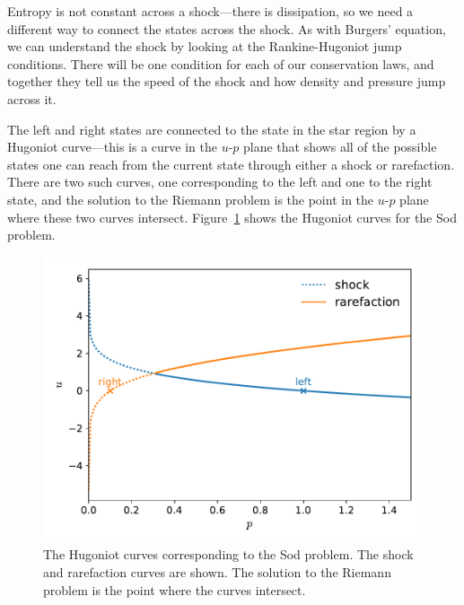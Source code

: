 Entropy is not constant across a shock---there is dissipation, so we
need a different way to connect the states across the shock.  As with
Burgers' equation, we can understand the shock by looking at the
Rankine-Hugoniot jump conditions.  There will be one condition for
each of our conservation laws, and together they tell us the speed of
the shock and how density and pressure jump across
it.  

The left and right states are connected to the state in the star
region by a Hugoniot curve---this is a curve in the $u$-$p$ plane that
shows all of the possible states one can reach from the current state
through either a shock or rarefaction.  There are two such curves, one
corresponding to the left and one to the right state, and the solution
to the Riemann problem is the point in the $u$-$p$ plane where these
two curves intersect.  Figure~\ref{fig:euler:riemann-curve} shows the
Hugoniot curves for the Sod problem.

\begin{figure}[t]
\centering
\includegraphics[width=0.9\linewidth]{riemann-phase}
\caption[The Hugoniot curves corresponding
to the Sod problem]{\label{fig:euler:riemann-curve} The Hugoniot
curves corresponding to the Sod problem.  The shock and rarefaction
curves are shown.  The solution to the Riemann problem is the point
where the curves intersect.\\
}
\end{figure}





